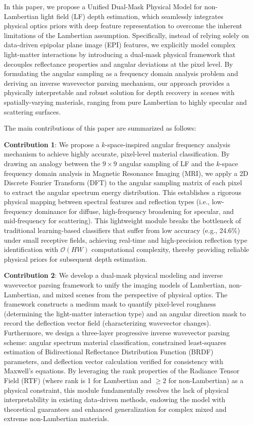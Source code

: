 In this paper, we propose a Unified Dual-Mask Physical Model for non-Lambertian light field (LF) depth estimation, which seamlessly integrates physical optics priors with deep feature representation to overcome the inherent limitations of the Lambertian assumption. Specifically, instead of relying solely on data-driven epipolar plane image (EPI) features, we explicitly model complex light-matter interactions by introducing a dual-mask physical framework that decouples reflectance properties and angular deviations at the pixel level. By formulating the angular sampling as a frequency domain analysis problem and deriving an inverse wavevector parsing mechanism, our approach provides a physically interpretable and robust solution for depth recovery in scenes with spatially-varying materials, ranging from pure Lambertian to highly specular and scattering surfaces. 

The main contributions of this paper are summarized as follows:

\item \textbf{Contribution 1}: We propose a \(k\)-space-inspired angular frequency analysis mechanism to achieve highly accurate, pixel-level material classification. By drawing an analogy between the \(9 \times 9\) angular sampling of LF and the \(k\)-space frequency domain analysis in Magnetic Resonance Imaging (MRI), we apply a 2D Discrete Fourier Transform (DFT) to the angular sampling matrix of each pixel to extract the angular spectrum energy distribution. This establishes a rigorous physical mapping between spectral features and reflection types (i.e., low-frequency dominance for diffuse, high-frequency broadening for specular, and mid-frequency for scattering). This lightweight module breaks the bottleneck of traditional learning-based classifiers that suffer from low accuracy (e.g., 24.6\%) under small receptive fields, achieving real-time and high-precision reflection type identification with \(\mathcal{O}(HW)\) computational complexity, thereby providing reliable physical priors for subsequent depth estimation.

\item \textbf{Contribution 2}: We develop a dual-mask physical modeling and inverse wavevector parsing framework to unify the imaging models of Lambertian, non-Lambertian, and mixed scenes from the perspective of physical optics. The framework constructs a medium mask to quantify pixel-level roughness (determining the light-matter interaction type) and an angular direction mask to record the deflection vector field (characterizing wavevector changes). Furthermore, we design a three-layer progressive inverse wavevector parsing scheme: angular spectrum material classification, constrained least-squares estimation of Bidirectional Reflectance Distribution Function (BRDF) parameters, and deflection vector calculation verified for consistency with Maxwell's equations. By leveraging the rank properties of the Radiance Tensor Field (RTF) (where rank is 1 for Lambertian and \(\ge 2\) for non-Lambertian) as a physical constraint, this module fundamentally resolves the lack of physical interpretability in existing data-driven methods, endowing the model with theoretical guarantees and enhanced generalization for complex mixed and extreme non-Lambertian materials.

